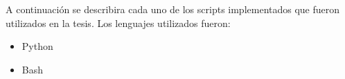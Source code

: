 A continuación se describira cada uno de los scripts implementados que fueron utilizados en la tesis. Los lenguajes utilizados fueron:

\begin{itemize}
    \item Python
    \item Bash
\end{itemize}
